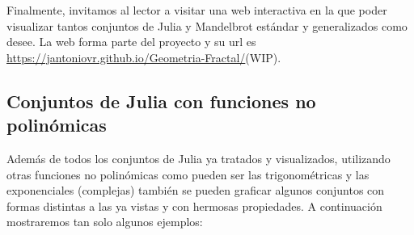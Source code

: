 Finalmente, invitamos al lector a visitar una web interactiva en la que poder visualizar tantos conjuntos de Julia y Mandelbrot estándar y generalizados como desee. La web forma parte del proyecto y su url es \url{https://jantoniovr.github.io/Geometria-Fractal/}(WIP).%

\subsection{Conjuntos de Julia con funciones no polinómicas}

Además de todos los conjuntos de Julia ya tratados y visualizados, utilizando otras funciones no polinómicas como pueden ser las trigonométricas y las exponenciales (complejas) también se pueden graficar algunos conjuntos con formas distintas a las ya vistas y con hermosas propiedades. A continuación mostraremos tan solo algunos ejemplos:

